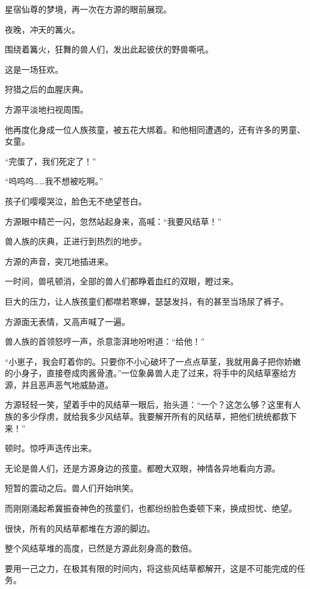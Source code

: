 
\begin{this_body}

星宿仙尊的梦境，再一次在方源的眼前展现。

夜晚，冲天的篝火。

围绕着篝火，狂舞的兽人们，发出此起彼伏的野兽嘶吼。

这是一场狂欢。

狩猎之后的血腥庆典。

方源平淡地扫视周围。

他再度化身成一位人族孩童，被五花大绑着。和他相同遭遇的，还有许多的男童、女童。

“完蛋了，我们死定了！”

“呜呜呜……我不想被吃啊。”

孩子们嘤嘤哭泣，脸色无不绝望苍白。

方源眼中精芒一闪，忽然站起身来，高喊：“我要风结草！”

兽人族的庆典，正进行到热烈的地步。

方源的声音，突兀地插进来。

一时间，兽吼顿消，全部的兽人们都睁着血红的双眼，瞪过来。

巨大的压力，让人族孩童们都噤若寒蝉，瑟瑟发抖，有的甚至当场尿了裤子。

方源面无表情，又高声喊了一遍。

兽人族的首领怒哼一声，杀意澎湃地吩咐道：“给他！”

“小崽子，我会盯着你的。只要你不小心破坏了一点点草茎，我就用鼻子把你娇嫩的小身子，直接卷成肉酱骨渣。”一位象鼻兽人走了过来，将手中的风结草塞给方源，并且恶声恶气地威胁道。

方源轻轻一笑，望着手中的风结草一眼后，抬头道：“一个？这怎么够？这里有人族的多少俘虏，就给我多少风结草。我要解开所有的风结草，把他们统统都救下来！”

顿时。惊呼声迭传出来。

无论是兽人们，还是方源身边的孩童。都瞪大双眼，神情各异地看向方源。

短暂的震动之后。兽人们开始哄笑。

而刚刚涌起希冀振奋神色的孩童们，也都纷纷脸色委顿下来，换成担忧、绝望。

很快，所有的风结草都堆在方源的脚边。

整个风结草堆的高度，已然是方源此刻身高的数倍。

要用一己之力，在极其有限的时间内，将这些风结草都解开，这是不可能完成的任务。


\end{this_body}
